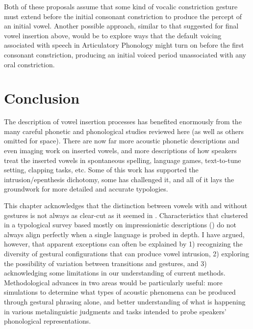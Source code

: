 \documentclass[output=paper,colorlinks,citecolor=brown]{langscibook}
\begin{document}
Both of these proposals assume that some kind of vocalic constriction gesture must extend before the initial consonant constriction to produce the percept of an initial vowel. Another possible approach, similar to that suggested for final vowel insertion above, would be to explore ways that the default voicing associated with speech in Articulatory Phonology might turn on before the first consonant constriction, producing an initial voiced period unassociated with any oral constriction. 

\section{Conclusion} \label{sec6}

The description of vowel insertion processes has benefited enormously from the many careful phonetic and phonological studies reviewed here (as well as others omitted for space). There are now far more acoustic phonetic descriptions and even imaging work on inserted vowels, and more descriptions of how speakers treat the inserted vowels in spontaneous spelling, language games, text-to-tune setting, clapping tasks, etc. Some of this work has supported the intrusion\slash epenthesis dichotomy, some has challenged it, and all of it lays the groundwork for more detailed and accurate typologies. 

This chapter acknowledges that the distinction between vowels with and without gestures is not always as clear-cut as it seemed in \citet{Hall:2003,Hall2006}. Characteristics that clustered in a typological survey based mostly on impressionistic descriptions () do not always align perfectly when a single language is probed in depth. I have argued, however, that apparent exceptions can often be explained by 1) recognizing the diversity of gestural configurations that can produce vowel intrusion, 2) exploring the possibility of variation between transitions and gestures, and 3) acknowledging some limitations in our understanding of current methods. Methodological advances in two areas would be particularly useful: more simulations to determine what types of acoustic phenomena can be produced through gestural phrasing alone, and better understanding of what is happening in various metalinguistic judgments and tasks intended to probe speakers’ phonological representations.  

{\sloppy\printbibliography[heading=subbibliography,notkeyword=this]}
\end{document}
